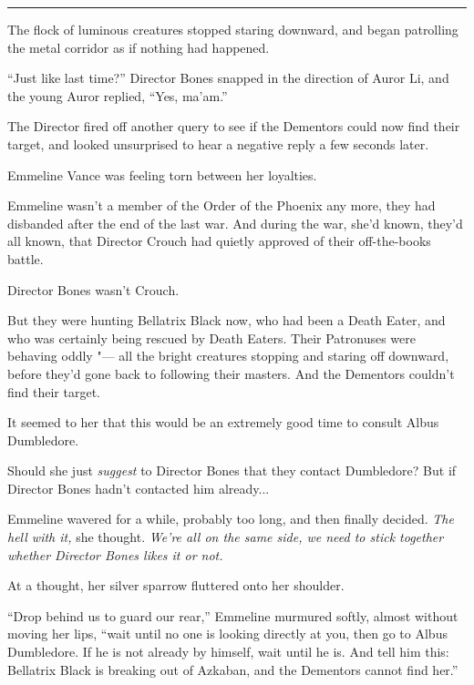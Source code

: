 \begin{center}\rule{3in}{0.4pt}\end{center}

The flock of luminous creatures stopped staring downward, and began
patrolling the metal corridor as if nothing had happened.

``Just like last time?'' Director Bones snapped in the direction of
Auror Li, and the young Auror replied, ``Yes, ma'am.''

The Director fired off another query to see if the Dementors could now
find their target, and looked unsurprised to hear a negative reply a few
seconds later.

Emmeline Vance was feeling torn between her loyalties.

Emmeline wasn't a member of the Order of the Phoenix any more, they had
disbanded after the end of the last war. And during the war, she'd
known, they'd all known, that Director Crouch had quietly approved of
their off-the-books battle.

Director Bones wasn't Crouch.

But they were hunting Bellatrix Black now, who had been a Death Eater,
and who was certainly being rescued by Death Eaters. Their Patronuses
were behaving oddly "--- all the bright creatures stopping and staring off
downward, before they'd gone back to following their masters. And the
Dementors couldn't find their target.

It seemed to her that this would be an extremely good time to consult
Albus Dumbledore.

Should she just \emph{suggest} to Director Bones that they contact
Dumbledore? But if Director Bones hadn't contacted him already...

Emmeline wavered for a while, probably too long, and then finally
decided. \emph{The hell with it,} she thought. \emph{We're all on the
same side, we need to stick together whether Director Bones likes it or
not.}

At a thought, her silver sparrow fluttered onto her shoulder.

``Drop behind us to guard our rear,'' Emmeline murmured softly, almost
without moving her lips, ``wait until no one is looking directly at you,
then go to Albus Dumbledore. If he is not already by himself, wait until
he is. And tell him this: Bellatrix Black is breaking out of Azkaban,
and the Dementors cannot find her.''
